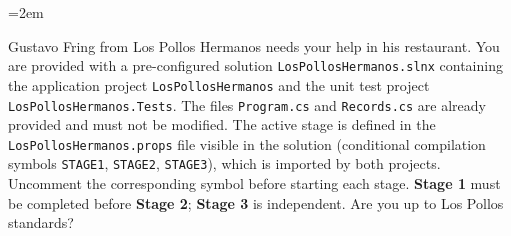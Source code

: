 \documentclass[11pt,a4paper,addpoints]{exam}
\begin{document}
\emergencystretch=2em

\cellwidth{2.75cm}
\noindent \gradetable[h]

\vspace{0.4cm}

\noindent Gustavo Fring from Los Pollos Hermanos needs your help in his restaurant. You are provided with a pre-configured solution \texttt{LosPollosHermanos.slnx} containing the application project \texttt{LosPollosHermanos} and the unit test project \texttt{LosPollosHermanos.Tests}. The files \texttt{Program.cs} and \texttt{Records.cs} are already provided and must not be modified. The active stage is defined in the \texttt{LosPollosHermanos.props} file visible in the solution (conditional compilation symbols \texttt{STAGE1}, \texttt{STAGE2}, \texttt{STAGE3}), which is imported by both projects. Uncomment the corresponding symbol before starting each stage. \textbf{Stage 1} must be completed before \textbf{Stage 2}; \textbf{Stage 3} is independent. Are you up to Los Pollos standards?
\end{document}
